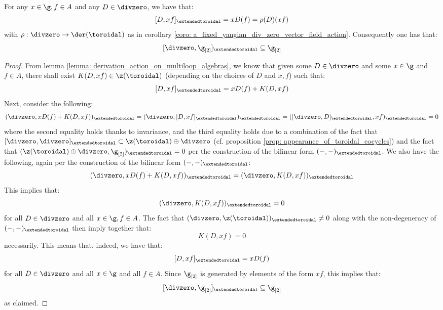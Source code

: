         \begin{lemma} \label{lemma: no_polynomial_terms_for_derivation_action_on_multiloop_algebras}
            For any $x \in \g, f \in A$ and any $D \in \divzero$, we have that:
                $$[D, xf]_{\extendedtoroidal} = x D(f) = \rho(D)(xf)$$
            with $\rho: \divzero \to \der(\toroidal)$ as in corollary \ref{coro: a_fixed_yangian_div_zero_vector_field_action}. Consequently one has that:
                $$[\divzero, \g_{[2]}]_{\extendedtoroidal} \subseteq \g_{[2]}$$
        \end{lemma}
            \begin{proof}
                From lemma \ref{lemma: derivation_action_on_multiloop_algebras}, we know that given some $D \in \divzero$ and some $x \in \g$ and $f \in A$, there shall exist $K(D, xf) \in \z(\toroidal)$ (depending on the choices of $D$ and $x, f$) such that:
                    $$[D, xf]_{\extendedtoroidal} = x D(f) + K(D, xf)$$
                Next, consider the following:
                    $$( \divzero, x D(f) + K(D, xf) )_{\extendedtoroidal} = ( \divzero, [D, xf]_{\extendedtoroidal} )_{\extendedtoroidal} = ( [\divzero, D]_{\extendedtoroidal}, xf )_{\extendedtoroidal} = 0$$
                where the second equality holds thanks to invariance, and the third equality holds due to a combination of the fact that $[\divzero, \divzero]_{\extendedtoroidal} \subset \z(\toroidal) \oplus \divzero$ (cf. proposition \ref{prop: appearance_of_toroidal_cocycles}) and the fact that $(\z(\toroidal) \oplus \divzero, \g_{[2]})_{\extendedtoroidal} = 0$ per the construction of the bilinear form $(-, -)_{\extendedtoroidal}$. We also have the following, again per the construction of the bilinear form $(-, -)_{\extendedtoroidal}$:
                    $$( \divzero, x D(f) + K(D, xf) )_{\extendedtoroidal} = ( \divzero, K(D, xf) )_{\extendedtoroidal}$$
                This implies that:
                    $$( \divzero, K(D, xf) )_{\extendedtoroidal} = 0$$
                for all $D \in \divzero$ and all $x \in \g, f \in A$. The fact that $( \divzero, \z(\toroidal) )_{\extendedtoroidal} \not = 0$ along with the non-degeneracy of $(-, -)_{\extendedtoroidal}$ then imply together that:
                    $$K(D, xf) = 0$$
                necessarily. This means that, indeed, we have that:
                    $$[D, xf]_{\extendedtoroidal} = x D(f)$$
                for all $D \in \divzero$ and all $x \in \g$ and all $f \in A$. Since $\g_{[2]}$ is generated by elements of the form $xf$, this implies that:
                    $$[\divzero, \g_{[2]}]_{\extendedtoroidal} \subseteq \g_{[2]}$$
                as claimed. 
            \end{proof}

